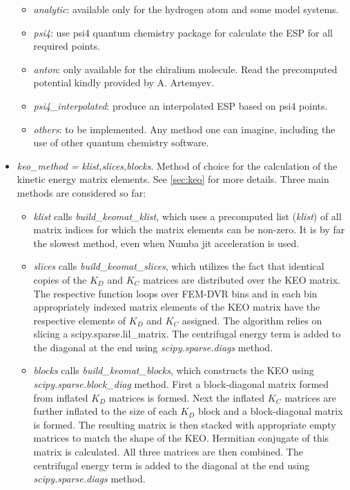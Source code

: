 \documentclass[a4paper,american,floatfix,pdftex,superscriptaddress,twoside,%
aps,pra,
linenumbers,%
reprint,%
]{revtex4-2}%
\begin{document}
\begin{itemize}
\begin{itemize}
		\item \textit{analytic}: available only for the hydrogen atom and some model systems. 
		\item \textit{psi4}: use psi4 quantum chemistry package for calculate the ESP for all required points.
		\item \textit{anton}: only available for the chiralium molecule. Read the precomputed potential kindly provided by A. Artemyev.
		\item \textit{psi4\_interpolated}: produce an interpolated ESP based on psi4 points.
		\item \textit{others}: to be implemented. Any method one can imagine, including the use of other quantum chemistry software. 
	\end{itemize}
	\item \textit{keo\_method = klist,slices,blocks}. Method of choice for the calculation of the kinetic energy matrix elements. See \ref{sec:keo} for more details. Three main methods are considered so far:
	\begin{itemize}
		\item \textit{klist} calls \textit{build\_keomat\_klist}, which uses a precomputed list (\textit{klist}) of all matrix indices for which the matrix elements can be non-zero. It is by far the slowest method, even when Numba jit acceleration is used.
		\item \textit{slices}  calls \textit{build\_keomat\_slices}, which utilizes the fact that identical copies of the $K_D$ and $K_C$ matrices are distributed over the KEO matrix. The respective function loops over FEM-DVR bins and in each bin appropriately indexed matrix elements of the KEO matrix have the respective elements of $K_D$ and $K_C$ assigned. The algorithm relies on slicing a scipy.sparse.lil\_matrix. The centrifugal energy term is added to the diagonal at the end using \textit{scipy.sparse.diags} method.
		\item \textit{blocks}  calls \textit{build\_keomat\_blocks}, which constructs the KEO using \textit{scipy.sparse.block\_diag} method. First a block-diagonal matrix formed from inflated $K_D$ matrices is formed. Next the inflated $K_C$ matrices are further inflated to the size of each $K_D$ block and a block-diagonal matrix is formed. The resulting matrix is then stacked with appropriate empty matrices to match the shape of the KEO. Hermitian conjugate of this matrix is calculated. All three matrices are then combined. The centrifugal energy term is added to the diagonal at the end using \textit{scipy.sparse.diags} method. 
	\end{itemize}
\end{itemize}

\end{document}
